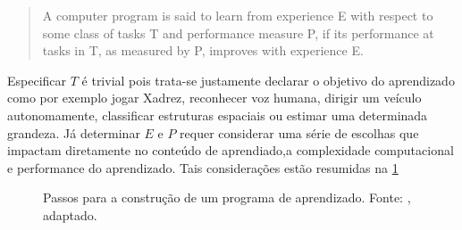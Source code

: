 \begin{quotation}
A computer program is said to learn from experience E with respect to some class of tasks T and performance measure P, if its performance at tasks in T, as measured by P, improves with experience E. 
\end{quotation}

Especificar $ T $ é trivial pois trata-se justamente declarar o objetivo do aprendizado como por exemplo jogar Xadrez, reconhecer  voz humana, dirigir um veículo autonomamente, classificar estruturas espaciais ou estimar uma determinada grandeza. Já determinar $ E $ e $ P $ requer considerar uma série de escolhas que impactam diretamente no conteúdo de aprendiado,a complexidade computacional e performance do aprendizado. Tais considerações estão resumidas na \cref{fig:michtel_modelagem} 

\begin{figure}[h!]
\centering
{}
\caption[Passos para a construção de um programa de aprendizado.]{Passos para a construção de um programa de aprendizado. Fonte: \cite[p.13]{Mitchell}, adaptado.}
\label{fig:michtel_modelagem}
\end{figure}

